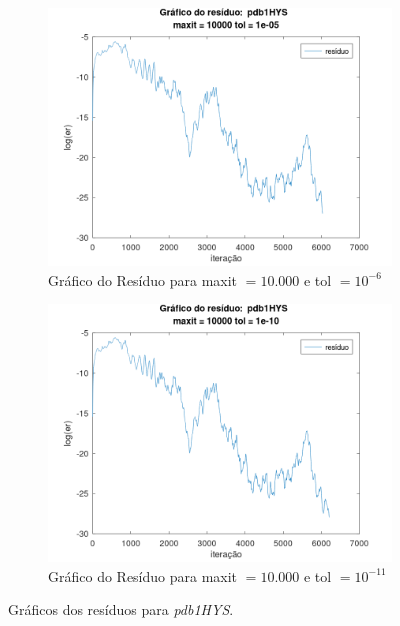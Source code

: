 \begin{figure}[H]
    \par\bigskip
    \begin{subfigure}[t]{0.4\linewidth}
         \centering
         \includegraphics[width=\textwidth]{image/pdb1HYS_10000_-6.png}
         \caption{Gráfico do Resíduo para maxit $= 10.000$ e tol $=10^{-6}$}
         \label{fig:pdb1HYS-10-6}
    \end{subfigure}
    \quad
    \begin{subfigure}[t]{0.4\linewidth}
         \centering
         \includegraphics[width=\textwidth]{image/pdb1HYS_10000_-11.png}
         \caption{Gráfico do Resíduo para maxit $= 10.000$ e tol $=10^{-11}$}
         \label{fig:pdb1HYS-10-11}
    \end{subfigure}
    \caption{Gráficos dos resíduos para \textit{pdb1HYS}.}
    \label{fig:pdb1HYS}
\end{figure}